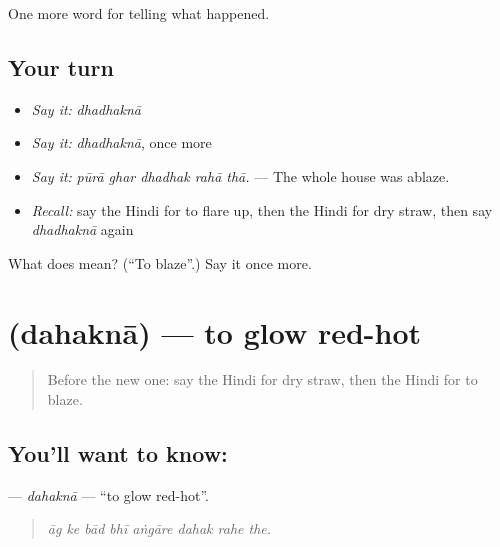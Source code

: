 \begin{grammarlens}[title={What you've built}]
One more word for telling what happened.
\end{grammarlens}

\subsection*{Your turn}
\begin{itemize}
\raggedright
  \item \emph{Say it:} \emph{dhadhaknā}
  \item \emph{Say it:} \emph{dhadhaknā}, once more
  \item \emph{Say it:} \emph{pūrā ghar dhadhak rahā thā.} — The whole house was ablaze.
  \item \emph{Recall:} say the Hindi for to flare up, then the Hindi for dry straw, then say \emph{dhadhaknā} again
\end{itemize}

\begin{tcolorbox}[breakable,colback=teal!4,colframe=teal!35!black,title={Before you move on}]
What does  mean? (\textquotedblleft{}To blaze\textquotedblright{}.) Say it once more.
\end{tcolorbox}
\section[\texorpdfstring{\hi{दहकना} (dahaknā)}{दहकना (dahaknā)}]{ (dahaknā) — to glow red-hot}

\label{lesson:HI-C300-dahakna}



\begin{quote}
Before the new one: say the Hindi for dry straw, then the Hindi for to blaze.
\end{quote}

\subsection*{You'll want to know: }
\textbf{} — \emph{dahaknā} — \textquotedblleft{}to glow red-hot\textquotedblright{}.

\begin{quote}
       
\end{quote}

\begin{quote}
\emph{āg ke bād bhī aṅgāre dahak rahe the.}
\end{quote}


